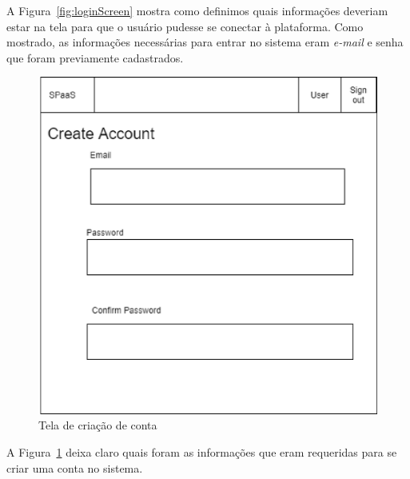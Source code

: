 \documentclass[11pt,twoside]{article}
\begin{document}
A Figura~\ref{fig:loginScreen} mostra como definimos quais informações deveriam estar na tela para que o usuário pudesse se conectar à plataforma. Como mostrado, 
as informações necessárias para entrar no sistema eram \emph{e-mail} e senha que foram previamente cadastrados.

\begin{figure}[!h]
  \centering
  \includegraphics[scale=0.4]{account_reg.eps}
  \caption{Tela de criação de conta}
  \label{fig:createScreen}
\end{figure}

A Figura~\ref{fig:createScreen} deixa claro quais foram as informações que eram requeridas para se criar uma conta no sistema. 
\end{document}
